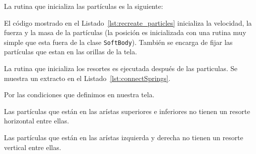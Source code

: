 La rutina que inicializa las partículas es la siguiente:

{\centering
\begin{minipage}{\linewidth}
\end{minipage}
\par
}

El código mostrado en el Listado~\ref{lst:recreate_particles} inicializa la velocidad, la fuerza y la masa de la partículas (la posición es inicializada con una rutina muy simple que esta fuera de la clase \texttt{SoftBody}). También se encarga de fijar las partículas que estan en las orillas de la tela.

La rutina que inicializa los resortes es ejecutada después de las particulas. Se muestra un extracto en el Listado~\ref{lst:connectSprings}.

{\centering
\begin{minipage}{\linewidth}
\end{minipage}
\par
}

Por las condiciones que definimos en nuestra tela. 
\begin{center}
 \item Las partículas que están en las arístas superiores e inferiores no tienen un resorte horizontal entre ellas.
 \item Las partículas que están en las arístas izquierda y derecha no tienen un resorte vertical entre ellas.
\end{center} 

